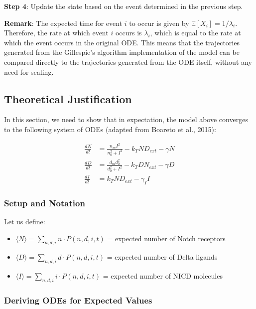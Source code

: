 \documentclass{article}
\begin{document}
\begin{flushleft}
\medskip

\textbf{Step 4}: Update the state based on the event determined in the previous step.

\medskip

\textbf{Remark}: The expected time for event $i$ to occur is given by $\mathbb{E}[X_{i}] = 1/\lambda_{i}$. Therefore, the rate at which event $i$ occurs is $\lambda_{i}$, which is equal to the rate at which the event occurs in the original ODE. This means that the trajectories generated from the Gillespie's algorithm implementation of the model can be compared directly to the trajectories generated from the ODE itself, without any need for scaling.

\subsection{Theoretical Justification}

In this section, we need to show that in expectation, the model above converges to the following system of ODEs (adapted from Boareto et al., 2015):

$$
\begin{aligned}
  \frac{dN}{dt} &= \frac{n_{m}I^2}{n_{0}^2 + I^2} - k_{T}ND_{ext} - \gamma N \\[5pt]
  \frac{dD}{dt} &= \frac{d_{m}d_{0}^2}{d_{0}^2 + I^2} - k_{T}DN_{ext} - \gamma D \\[5pt]
  \frac{dI}{dt} &= k_{T}ND_{ext} - \gamma_{I}I
\end{aligned}
$$

\subsubsection{Setup and Notation}

Let us define:
\begin{itemize}
  \item $\langle N \rangle = \sum_{n,d,i} n \cdot P(n,d,i,t)$ = expected number of Notch receptors
  \item $\langle D \rangle = \sum_{n,d,i} d \cdot P(n,d,i,t)$ = expected number of Delta ligands
  \item $\langle I \rangle = \sum_{n,d,i} i \cdot P(n,d,i,t)$ = expected number of NICD molecules
\end{itemize}
\subsubsection{Deriving ODEs for Expected Values}


\end{flushleft}
\end{document}
